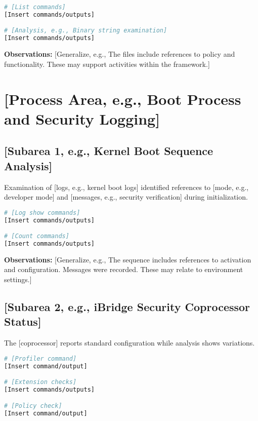 \documentclass[11pt, a4paper]{article}
\begin{document}
\begin{lstlisting}[language=bash, caption={[Framework] Components}, label={lst:virtualization}]
# [List commands]
[Insert commands/outputs]

# [Analysis, e.g., Binary string examination]
[Insert commands/outputs]
\end{lstlisting}

\textbf{Observations:} [Generalize, e.g., The files include references to policy and functionality. These may support activities within the framework.]

\section{[Process Area, e.g., Boot Process and Security Logging]}

\subsection{[Subarea 1, e.g., Kernel Boot Sequence Analysis]}
Examination of [logs, e.g., kernel boot logs] identified references to [mode, e.g., developer mode] and [messages, e.g., security verification] during initialization.

\begin{lstlisting}[language=bash, caption={Boot Sequence Logging Analysis}, label={lst:boot_sequence}]
# [Log show commands]
[Insert commands/outputs]

# [Count commands]
[Insert commands/outputs]
\end{lstlisting}

\textbf{Observations:} [Generalize, e.g., The sequence includes references to activation and configuration. Messages were recorded. These may relate to environment settings.]

\subsection{[Subarea 2, e.g., iBridge Security Coprocessor Status]}
The [coprocessor] reports standard configuration while analysis shows variations.

\begin{lstlisting}[language=bash, caption={[Coprocessor] Security Status Examination}, label={lst:ibridge}]
# [Profiler command]
[Insert command/output]

# [Extension checks]
[Insert commands/outputs]

# [Policy check]
[Insert command/output]
\end{lstlisting}
\end{document}
